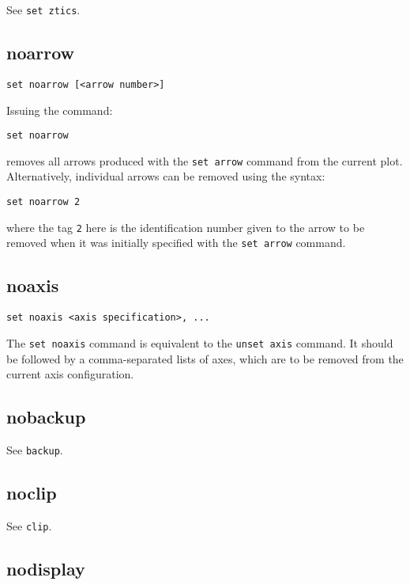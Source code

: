 See {\tt set ztics}.


\subsection{noarrow}

\begin{verbatim}
set noarrow [<arrow number>]
\end{verbatim}

Issuing the command:

\begin{verbatim}
set noarrow
\end{verbatim}

\noindent removes all arrows produced with the {\tt set arrow} command from the current
plot. Alternatively, individual arrows can be removed using the syntax:

\begin{verbatim}
set noarrow 2
\end{verbatim}

\noindent where the tag {\tt 2} here is the identification number given to
the arrow to be removed when it was initially specified with the {\tt set arrow}
command.


\subsection{noaxis}

\begin{verbatim}
set noaxis <axis specification>, ...
\end{verbatim}

The {\tt set noaxis} command is equivalent to the {\tt unset axis} command. It
should be followed by a comma-separated lists of axes, which are to be removed
from the current axis configuration.


\subsection{nobackup}

See {\tt backup}.


\subsection{noclip}

See {\tt clip}.


\subsection{nodisplay}

